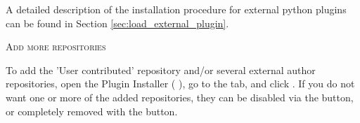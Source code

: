 A detailed description of the installation procedure for external python
plugins can be found in Section \ref{sec:load_external_plugin}.

\begin{Tip} \caption{\textsc{Add more repositories}}
To add the 'User contributed' repository and/or several external author repositories, open the
Plugin Installer ( \arrow {}),
go to the  tab, and click .
If you do not want one or more of the added repositories, they can be disabled via the
 button, or completely removed with the  button.
\end{Tip}
\FloatBarrier
